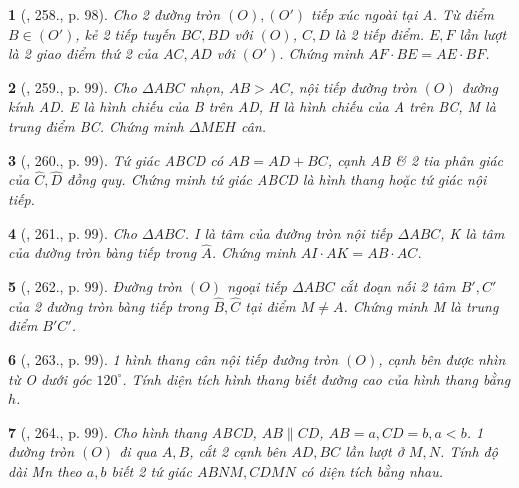 \documentclass{article}
\newtheorem{baitoan}{}
\begin{document}
\begin{baitoan}[\cite{Binh_Toan_9_tap_2}, 258., p. 98]
	Cho 2 đường tròn $(O),(O')$ tiếp xúc ngoài tại A. Từ điểm $B\in(O')$, kẻ 2 tiếp tuyến $BC,BD$ với $(O)$, $C,D$ là 2 tiếp điểm. $E,F$ lần lượt là 2 giao điểm thứ 2 của $AC,AD$ với $(O')$. Chứng minh $AF\cdot BE = AE\cdot BF$.
\end{baitoan}

\begin{baitoan}[\cite{Binh_Toan_9_tap_2}, 259., p. 99]
	Cho $\Delta ABC$ nhọn, $AB > AC$, nội tiếp đường tròn $(O)$ đường kính AD. E là hình chiếu của B trên AD, H là hình chiếu của A trên BC, M là trung điểm BC. Chứng minh $\Delta MEH$ cân.
\end{baitoan}

\begin{baitoan}[\cite{Binh_Toan_9_tap_2}, 260., p. 99]
	Tứ giác ABCD có $AB = AD + BC$, cạnh AB \& 2 tia phân giác của $\widehat{C},\widehat{D}$ đồng quy. Chứng minh tứ giác ABCD là hình thang hoặc tứ giác nội tiếp.
\end{baitoan}

\begin{baitoan}[\cite{Binh_Toan_9_tap_2}, 261., p. 99]
	Cho $\Delta ABC$. I là tâm của đường tròn nội tiếp $\Delta ABC$, K là tâm của đường tròn bàng tiếp trong $\widehat{A}$. Chứng minh $AI\cdot AK = AB\cdot AC$.
\end{baitoan}

\begin{baitoan}[\cite{Binh_Toan_9_tap_2}, 262., p. 99]
	Đường tròn $(O)$ ngoại tiếp $\Delta ABC$ cắt đoạn nối 2 tâm $B',C'$ của 2 đường tròn bàng tiếp trong $\widehat{B},\widehat{C}$ tại điểm $M\ne A$. Chứng minh M là trung điểm $B'C'$.
\end{baitoan}

\begin{baitoan}[\cite{Binh_Toan_9_tap_2}, 263., p. 99]
	1 hình thang cân nội tiếp đường tròn $(O)$, cạnh bên được nhìn từ O dưới góc $120^\circ$. Tính diện tích hình thang biết đường cao của hình thang bằng $h$.
\end{baitoan}

\begin{baitoan}[\cite{Binh_Toan_9_tap_2}, 264., p. 99]
	Cho hình thang ABCD, $AB\parallel CD$, $AB = a,CD = b,a < b$. 1 đường tròn $(O)$ đi qua $A,B$, cắt 2 cạnh bên $AD,BC$ lần lượt ở $M,N$. Tính độ dài Mn theo $a,b$ biết 2 tứ giác $ABNM,CDMN$ có diện tích bằng nhau.
\end{baitoan}
\end{document}
